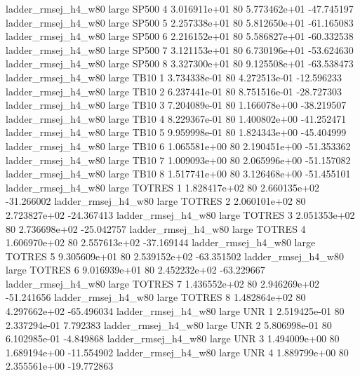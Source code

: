 ladder_rmsej_h4_w80      large    SP500                 4 3.016911e+01 80   5.773462e+01         -47.745197
ladder_rmsej_h4_w80      large    SP500                 5 2.257338e+01 80   5.812650e+01         -61.165083
ladder_rmsej_h4_w80      large    SP500                 6 2.216152e+01 80   5.586827e+01         -60.332538
ladder_rmsej_h4_w80      large    SP500                 7 3.121153e+01 80   6.730196e+01         -53.624630
ladder_rmsej_h4_w80      large    SP500                 8 3.327300e+01 80   9.125508e+01         -63.538473
ladder_rmsej_h4_w80      large     TB10                 1 3.734338e-01 80   4.272513e-01         -12.596233
ladder_rmsej_h4_w80      large     TB10                 2 6.237441e-01 80   8.751516e-01         -28.727303
ladder_rmsej_h4_w80      large     TB10                 3 7.204089e-01 80   1.166078e+00         -38.219507
ladder_rmsej_h4_w80      large     TB10                 4 8.229367e-01 80   1.400802e+00         -41.252471
ladder_rmsej_h4_w80      large     TB10                 5 9.959998e-01 80   1.824343e+00         -45.404999
ladder_rmsej_h4_w80      large     TB10                 6 1.065581e+00 80   2.190451e+00         -51.353362
ladder_rmsej_h4_w80      large     TB10                 7 1.009093e+00 80   2.065996e+00         -51.157082
ladder_rmsej_h4_w80      large     TB10                 8 1.517741e+00 80   3.126468e+00         -51.455101
ladder_rmsej_h4_w80      large   TOTRES                 1 1.828417e+02 80   2.660135e+02         -31.266002
ladder_rmsej_h4_w80      large   TOTRES                 2 2.060101e+02 80   2.723827e+02         -24.367413
ladder_rmsej_h4_w80      large   TOTRES                 3 2.051353e+02 80   2.736698e+02         -25.042757
ladder_rmsej_h4_w80      large   TOTRES                 4 1.606970e+02 80   2.557613e+02         -37.169144
ladder_rmsej_h4_w80      large   TOTRES                 5 9.305609e+01 80   2.539152e+02         -63.351502
ladder_rmsej_h4_w80      large   TOTRES                 6 9.016939e+01 80   2.452232e+02         -63.229667
ladder_rmsej_h4_w80      large   TOTRES                 7 1.436552e+02 80   2.946269e+02         -51.241656
ladder_rmsej_h4_w80      large   TOTRES                 8 1.482864e+02 80   4.297662e+02         -65.496034
ladder_rmsej_h4_w80      large      UNR                 1 2.519425e-01 80   2.337294e-01           7.792383
ladder_rmsej_h4_w80      large      UNR                 2 5.806998e-01 80   6.102985e-01          -4.849868
ladder_rmsej_h4_w80      large      UNR                 3 1.494009e+00 80   1.689194e+00         -11.554902
ladder_rmsej_h4_w80      large      UNR                 4 1.889799e+00 80   2.355561e+00         -19.772863
